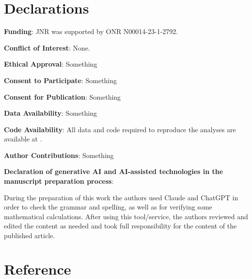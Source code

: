 \documentclass[
  ,man]{apa6}
\begin{document}
\section{Declarations}\label{declarations}

\textbf{Funding}: JNR was supported by ONR N00014-23-1-2792.

\textbf{Conflict of Interest}: None.

\textbf{Ethical Approval}: Something

\textbf{Consent to Participate}: Something

\textbf{Consent for Publication}: Something

\textbf{Data Availability}: Something

\textbf{Code Availability}: All data and code required to reproduce the analyses are available at .

\textbf{Author Contributions}: Something

\textbf{Declaration of generative AI and AI-assisted technologies in the manuscript preparation process}:

During the preparation of this work the authors used Claude and ChatGPT in order to check the grammar and spelling, as well as for verifying some mathematical calculations. After using this tool/service, the authors reviewed and edited the content as needed and took full responsibility for the content of the published article.

\newpage

\section*{Reference}\label{reference}
\end{document}
